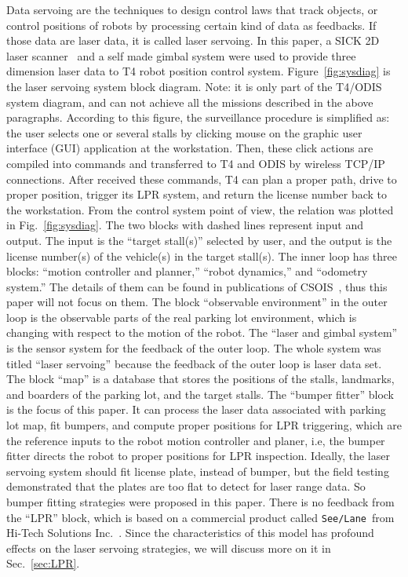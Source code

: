 \documentclass[]{spie}
\def\seelane{\texttt{See/Lane}\ }
\begin{document}
        Data servoing are the techniques to design control laws that track objects, or control positions of robots by processing certain kind of data as feedbacks. If those data are laser data, it is called laser servoing. In this paper, a SICK 2D laser scanner~\cite{SICKLaser} and a self made gimbal system were used to provide three dimension laser data to T4 robot position control system. Figure~\ref{fig:sysdiag} is the laser servoing system block diagram. Note: it is only part of the T4/ODIS system diagram, and can not achieve all the missions described in the above paragraphs. According to this figure, the surveillance procedure is simplified as: the user selects one or several stalls by clicking mouse on the graphic user interface (GUI) application at the workstation. Then, these click actions are compiled into commands and transferred to T4 and ODIS by wireless TCP/IP connections. After received these commands, T4 can plan a proper path, drive to proper position, trigger its LPR system, and return the license number back to the workstation. From the control system point of view, the relation was plotted in Fig.~\ref{fig:sysdiag}.  The two blocks with dashed lines represent input and output. The input is the ``target stall(s)'' selected by user, and the output is the license number(s) of the vehicle(s) in the target stall(s). The inner loop has three blocks: ``motion controller and planner,'' ``robot dynamics,'' and ``odometry system.'' The details of them can be found in publications of CSOIS~\cite{Shah02,BahlMultiRobot,Smuda02,moore_csm,odis_spie01,odis_icra01}, thus this paper will not focus on them.  The block ``observable environment'' in the outer loop is the observable parts of the real parking lot environment, which is changing with respect to the motion of the robot.  The ``laser and gimbal system'' is the sensor system for the feedback of the outer loop. The whole system was titled ``laser servoing'' because the feedback of the outer loop is laser data set. The block ``map'' is a database that stores the positions of the stalls, landmarks, and boarders of the parking lot, and the target stalls. The ``bumper fitter'' block is the focus of this paper. It can process the laser data associated with parking lot map, fit bumpers, and compute proper positions for LPR triggering, which are the reference inputs to the robot motion controller and planer, i.e, the bumper fitter directs the robot to proper positions for LPR inspection. Ideally, the laser servoing system should fit license plate, instead of bumper, but the field testing demonstrated that the plates are too flat to detect for laser range data. So bumper fitting strategies were proposed in this paper. There is no feedback from the ``LPR'' block, which is based on a commercial product called \seelane from Hi-Tech Solutions Inc.~\cite{HiTech}. Since the characteristics of this model has profound effects on the laser servoing strategies, we will discuss more on it in Sec.~\ref{sec:LPR}.
\end{document}
